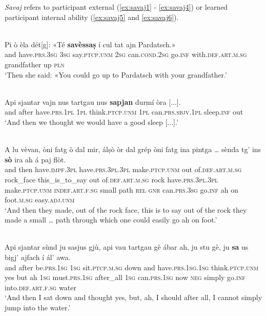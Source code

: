 \textit{Savaj} refers to participant external (\ref{ex:savaj1} - \ref{ex:savaj4}) or learned participant internal ability (\ref{ex:savaj5} and \ref{ex:savaj6}). 

\ea
\label{ex:savaj1}
\\
\gll  Pi ò èla dét[g]: «Té \textbf{savèssaṣ} í cul tat ajn Pardatsch.»  \\
and have.\textsc{prs.3sg} \textsc{3sg} say.\textsc{ptcp.unm} \textsc{2sg} can.\textsc{cond.2sg} go.\textsc{inf} with.\textsc{def.art.m.sg} grandfather up \textsc{pln}  \\
\glt `Then she said: «You could go up to Pardatsch with your grandfather.'
\z

\ea
\label{ex:savaj2}
\\
\gll    Api sjantar vajn nus tartgau nus \textbf{sapjan} durmí òra [...].\\
and after have.\textsc{prs.1pl} \textsc{1pl} think.\textsc{ptcp.unm} \textsc{1pl}  can.\textsc{prs.sbjv.1pl} sleep.\textsc{inf} out\\
\glt `And then we thought we would have a good sleep [...].'
\z

\ea
\label{ex:savaj3}
\\
\gll  A lu vèvan, òni fatg ò dal mir, álṣò òr dal grép òni fatg ina pintga …  sènda tg’ ins \textbf{sò} ira ah á paj flòt.\\
and then have.\textsc{impf.3pl} have.\textsc{prs.3pl.3pl} make.\textsc{ptcp.unm} out of.\textsc{def.art.m.sg} rock\_face this\_is\_to\_say out of.\textsc{def.art.m.sg} rock have.\textsc{prs.3pl.3pl} make.\textsc{ptcp.unm} \textsc{indef.art.f.sg} small {} path \textsc{rel} \textsc{gnr} can.\textsc{prs.3sg} go.\textsc{inf} ah on foot.\textsc{m.sg} easy.\textsc{adj.unm} \\
\glt `And then they made, out of the rock face, this is to say out of the rock they made a small … path through which one could easily go ah on foot.'
\z


\ea
\label{ex:savaj4}
\\
\gll  Api sjantar sùnd ju sasjus gjù, api vau tartgau gè ábar ah, ju stu gè, ju \textbf{sa} us bigj’ ajfach í ál’ awa.\\
and after be.\textsc{prs.1sg} \textsc{1sg} sit.\textsc{ptcp.m.sg} down and have.\textsc{prs.1sg.1sg} think.\textsc{ptcp.unm} yes but ah \textsc{1sg} must.\textsc{prs.1sg} after\_all \textsc{1sg} can.\textsc{prs.1sg} now \textsc{neg} simply go.\textsc{inf} into.\textsc{def.art.f.sg} water\\
\glt `And then I sat down and thought yes, but, ah, I should after all, I cannot simply jump into the water.'
\z                                       

